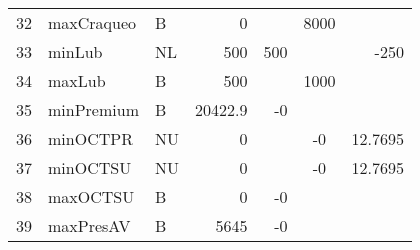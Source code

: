 \documentclass[a4paper,10pt]{article}
\begin{document}
\begin{flushleft}
\begin{tabular}{| l  l  l  r  r  c  r |}
     32 &   maxCraqueo &     B &                0 &                   &       8000   &  			\\ 
     33 &   minLub &         NL &             500 &             500 &                &           -250 \\ 
     34 &   maxLub &         B &              500 &                 &         1000    &  		\\ 
     35 &   minPremium &     B &          20422.9 &              -0 &                & 		\\ 
     36 &   minOCTPR &       NU &               0 &                  &             -0 &         12.7695 \\ 
     37 &   minOCTSU &       NU &               0 &                  &             -0 &         12.7695 \\ 
     38 &   maxOCTSU &       B &                0 &              -0 &                &		\\ 
     39 &   maxPresAV &      B &             5645 &              -0 &                &		\\ 
     \hline
       \end{tabular}
\end{flushleft}%
\end{document}
